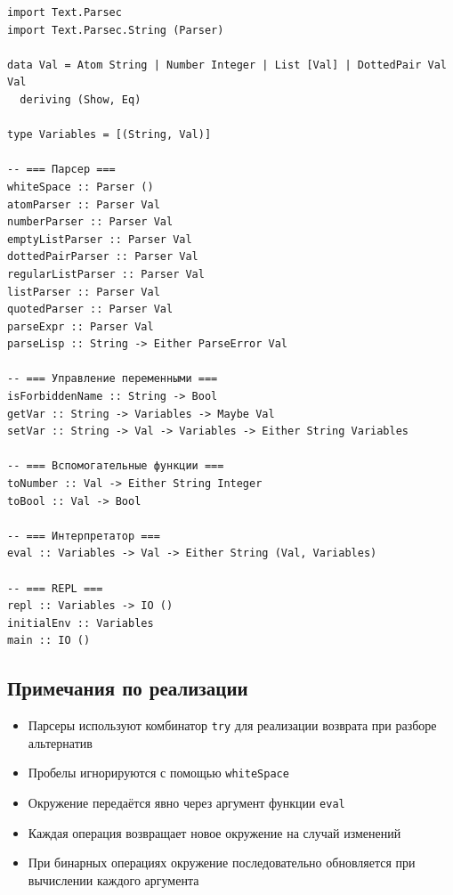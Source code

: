 \documentclass[a4paper,12pt]{article}
\begin{document}
\begin{lstlisting}
import Text.Parsec
import Text.Parsec.String (Parser)

data Val = Atom String | Number Integer | List [Val] | DottedPair Val Val
  deriving (Show, Eq)

type Variables = [(String, Val)]

-- === Парсер ===
whiteSpace :: Parser ()
atomParser :: Parser Val
numberParser :: Parser Val
emptyListParser :: Parser Val
dottedPairParser :: Parser Val
regularListParser :: Parser Val
listParser :: Parser Val
quotedParser :: Parser Val
parseExpr :: Parser Val
parseLisp :: String -> Either ParseError Val

-- === Управление переменными ===
isForbiddenName :: String -> Bool
getVar :: String -> Variables -> Maybe Val
setVar :: String -> Val -> Variables -> Either String Variables

-- === Вспомогательные функции ===
toNumber :: Val -> Either String Integer
toBool :: Val -> Bool

-- === Интерпретатор ===
eval :: Variables -> Val -> Either String (Val, Variables)

-- === REPL ===
repl :: Variables -> IO ()
initialEnv :: Variables
main :: IO ()
\end{lstlisting}

\subsection{Примечания по реализации}
\begin{itemize}
    \item Парсеры используют комбинатор \texttt{try} для реализации возврата при разборе альтернатив
    \item Пробелы игнорируются с помощью \texttt{whiteSpace}
    \item Окружение передаётся явно через аргумент функции \texttt{eval}
    \item Каждая операция возвращает новое окружение на случай изменений
    \item При бинарных операциях окружение последовательно обновляется при вычислении каждого аргумента
\end{itemize}
\end{document}
